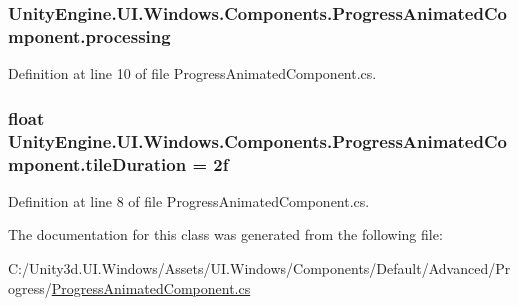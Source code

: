 \subsubsection[{processing}]{ Unity\+Engine.\+U\+I.\+Windows.\+Components.\+Progress\+Animated\+Component.\+processing}\label{class_unity_engine_1_1_u_i_1_1_windows_1_1_components_1_1_progress_animated_component_a5bf587a3db926534846d98abfa30ccc6}


Definition at line 10 of file Progress\+Animated\+Component.\+cs.

\hypertarget{class_unity_engine_1_1_u_i_1_1_windows_1_1_components_1_1_progress_animated_component_a22d2a1aaa168bf789988ae63ecf64bf3}{}
\subsubsection[{tile\+Duration}]{\setlength{\rightskip}{0pt plus 5cm}float Unity\+Engine.\+U\+I.\+Windows.\+Components.\+Progress\+Animated\+Component.\+tile\+Duration = 2f}\label{class_unity_engine_1_1_u_i_1_1_windows_1_1_components_1_1_progress_animated_component_a22d2a1aaa168bf789988ae63ecf64bf3}


Definition at line 8 of file Progress\+Animated\+Component.\+cs.



The documentation for this class was generated from the following file\+:\begin{DoxyCompactItemize}
\item 
C\+:/\+Unity3d.\+U\+I.\+Windows/\+Assets/\+U\+I.\+Windows/\+Components/\+Default/\+Advanced/\+Progress/\hyperlink{_progress_animated_component_8cs}{Progress\+Animated\+Component.\+cs}\end{DoxyCompactItemize}
